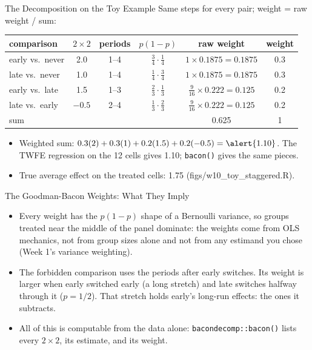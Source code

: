 \documentclass[aspectratio=169,11pt,xcolor=dvipsnames]{beamer}
\newcommand{\srcp}[1]{{\scriptsize\color{gray}(#1)}}
\newcommand{\adv}{\,\raisebox{0.6pt}{\textcolor{accent}{$\bigstar$}}}
\begin{document}
\begin{frame}{The Decomposition on the Toy Example}
Same steps for every pair; weight = raw weight / sum:
\vskip3pt
\begin{center}\small
\renewcommand{\arraystretch}{1.2}
\begin{tabular}{@{}lccccc@{}}
\toprule
comparison & $2\times2$ & periods & $p(1-p)$ & raw weight & weight \\
\midrule
early vs.\ never & 2.0 & 1--4 & $\tfrac34\cdot\tfrac14$ & $1 \times 0.1875 = 0.1875$ & 0.3 \\
late vs.\ never & 1.0 & 1--4 & $\tfrac14\cdot\tfrac34$ & $1 \times 0.1875 = 0.1875$ & 0.3 \\
early vs.\ late & 1.5 & 1--3 & $\tfrac23\cdot\tfrac13$ & $\tfrac{9}{16} \times 0.222 = 0.125$ & 0.2 \\
\alert{late vs.\ early} & \alert{$-0.5$} & 2--4 & $\tfrac13\cdot\tfrac23$ & $\tfrac{9}{16} \times 0.222 = 0.125$ & 0.2 \\
\midrule
sum & & & & 0.625 & 1 \\
\bottomrule
\end{tabular}
\end{center}
\vskip4pt
\begin{itemize}\itemsep3pt
  \item Weighted sum: $0.3(2) + 0.3(1) + 0.2(1.5) + 0.2(-0.5) = \alert{1.10}$. The TWFE regression on
        the 12 cells gives \alert{1.10}; \texttt{bacon()} gives the same pieces.
  \item True average effect on the treated cells: 1.75 \srcp{figs/w10\_toy\_staggered.R}.
\end{itemize}
\end{frame}

\begin{frame}{The Goodman-Bacon Weights: What They Imply\adv}
\begin{itemize}\itemsep3pt
  \item Every weight has the $p(1-p)$ shape of a Bernoulli variance,
        so \alert{groups treated near the middle of the panel dominate}: the
        weights come from OLS mechanics, not from group sizes alone and not from
        any estimand you chose (Week 1's variance weighting).
  \item The forbidden comparison uses the periods after early switches. Its weight is larger when
        early switched early (a long stretch) and late switches halfway through it ($p = 1/2$).
        That stretch holds early's long-run effects: the ones it subtracts.
  \item All of this is computable from the data alone:
        \texttt{bacondecomp::bacon()} lists every $2\times2$, its estimate, and
        its weight.
\end{itemize}
\end{frame}
\end{document}
